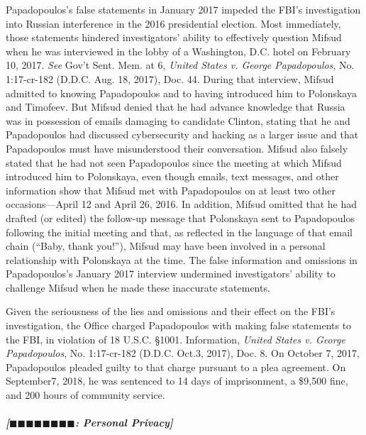 Papadopoulos's false statements in January 2017 impeded the FBI's investigation into Russian interference in the 2016 presidential election.
Most immediately, those statements hindered investigators' ability to effectively question Mifsud when he was interviewed in the lobby of a Washington, D.C. hotel on February 10, 2017.
\textit{See} Gov't Sent. Mem. at 6, \textit{United States v. George Papadopoulos}, No. 1:17-cr-182 (D.D.C. Aug. 18, 2017), Doc. 44.
During that interview, Mifsud admitted to knowing Papadopoulos and to having introduced him to Polonskaya and Timofeev.
But Mifsud denied that he had advance knowledge that Russia was in possession of emails damaging to candidate Clinton, stating that he and Papadopoulos had discussed cybersecurity and hacking as a larger issue and that Papadopoulos must have misunderstood their conversation.
Mifsud also falsely stated that he had not seen Papadopoulos since the meeting at which Mifsud introduced him to Polonskaya, even though emails, text messages, and other information show that Mifsud met with Papadopoulos on at least two other occasions---April 12 and April 26, 2016.
In addition, Mifsud omitted that he had drafted (or edited) the follow-up message that Polonskaya sent to Papadopoulos following the initial meeting and that, as reflected in the language of that email chain (``Baby, thank you!''), Mifsud may have been involved in a personal relationship with Polonskaya at the time.
The false information and omissions in Papadopoulos's January 2017 interview undermined investigators' ability to challenge Mifsud when he made these inaccurate statements.

Given the seriousness of the lies and omissions and their effect on the FBI's investigation, the Office charged Papadopoulos with making false statements to the FBI, in violation of 18 U.S.C. \S 1001.
Information, \textit{United States v. George Papadopoulos}, No. 1:17-cr-182 (D.D.C. Oct.3, 2017), Doc. 8.
On October 7, 2017, Papadopoulos pleaded guilty to that charge pursuant to a plea agreement.
On September7, 2018, he was sentenced to 14 days of imprisonment, a \$9,500 fine, and 200 hours of community service.

\subparagraph{[$\blacksquare\blacksquare\blacksquare\blacksquare\blacksquare\blacksquare\blacksquare\blacksquare$: Personal Privacy]}


